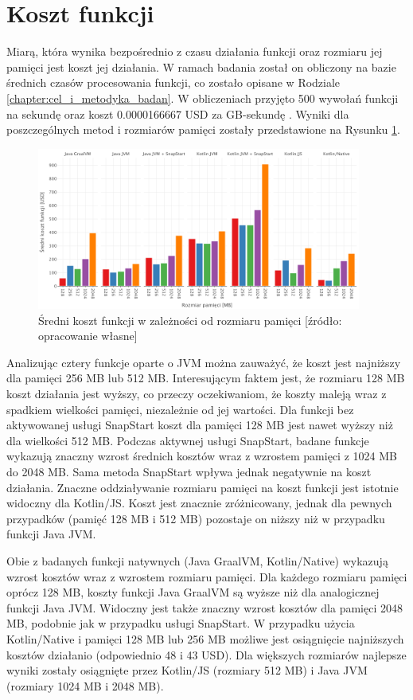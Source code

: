 \section{Koszt funkcji}\label{chapter:results_cost}

Miarą, która wynika bezpośrednio z czasu działania funkcji oraz rozmiaru jej pamięci jest koszt jej działania.
W ramach badania został on obliczony na bazie średnich czasów procesowania funkcji, co zostało opisane w Rodziale \ref{chapter:cel_i_metodyka_badan}.
W obliczeniach przyjęto 500 wywołań funkcji na sekundę oraz koszt 0.0000166667 USD za GB-sekundę \cite{awsLambdaPricing}.
Wyniki dla poszczególnych metod i rozmiarów pamięci zostały przedstawione na Rysunku \ref{fig:avg_costs}.

\begin{figure}[h]
    \centering
    \includegraphics[width=0.95\textwidth]{charts/results/average-cost.png}
    \caption{Średni koszt funkcji w zależności od rozmiaru pamięci [źródło: opracowanie własne]}
    \label{fig:avg_costs}
\end{figure}

Analizując cztery funkcje oparte o JVM można zauważyć, że koszt jest najniższy dla pamięci 256 MB lub 512 MB.
Interesującym faktem jest, że rozmiaru 128 MB koszt działania jest wyższy, co przeczy oczekiwaniom, że koszty maleją wraz z spadkiem wielkości pamięci, niezależnie od jej wartości.
Dla funkcji bez aktywowanej usługi SnapStart koszt dla pamięci 128 MB jest nawet wyższy niż dla wielkości 512 MB.
Podczas aktywnej usługi SnapStart, badane funkcje wykazują znaczny wzrost średnich kosztów wraz z wzrostem pamięci z 1024 MB do 2048 MB.
Sama metoda SnapStart wpływa jednak negatywnie na koszt działania.
Znaczne oddziaływanie rozmiaru pamięci na koszt funkcji jest istotnie widoczny dla Kotlin/JS.
Koszt jest znacznie zróżnicowany, jednak dla pewnych przypadków (pamięć 128 MB i 512 MB) pozostaje on niższy niż w przypadku funkcji Java JVM.

Obie z badanych funkcji natywnych (Java GraalVM, Kotlin/Native) wykazują wzrost kosztów wraz z wzrostem rozmiaru pamięci.
Dla każdego rozmiaru pamięci oprócz 128 MB, koszty funkcji Java GraalVM są wyższe niż dla analogicznej funkcji Java JVM.
Widoczny jest także znaczny wzrost kosztów dla pamięci 2048 MB, podobnie jak w przypadku usługi SnapStart.
W przypadku użycia Kotlin/Native i pamięci 128 MB lub 256 MB możliwe jest osiągnięcie najniższych kosztów działanio (odpowiednio 48 i 43 USD).
Dla większych rozmiarów najlepsze wyniki zostały osiągnięte przez Kotlin/JS (rozmiary 512 MB) i Java JVM (rozmiary 1024 MB i 2048 MB).
